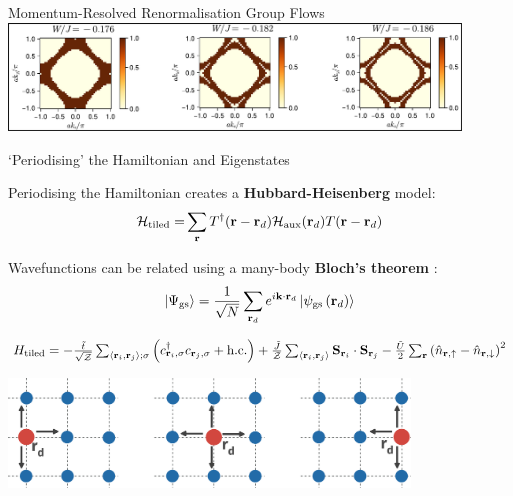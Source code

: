 \documentclass[11pt,aspectratio=169]{beamer}
\newcommand\focus[1]{%
	{\alert{\textbf{#1}}}
}
\begin{document}
\begin{frame}{Momentum-Resolved Renormalisation Group Flows}
\vspace*{\fill}
\includegraphics[width=0.9\textwidth]{scattProb.pdf}
	
\end{frame}

\begin{frame}{`Periodising' the Hamiltonian and Eigenstates}
	\begin{minipage}{0.45\textwidth}
		Periodising the Hamiltonian creates a \focus{Hubbard-Heisenberg} model:
	\begin{equation*}\begin{aligned}
		\mathcal{H}_\text{tiled} =& \sum_{{\bf r}}T^\dagger({\bf r} - {\bf r}_d)\mathcal{H}_\text{aux}({\bf r}_d)T({\bf r} - {\bf r}_d)\\
	\end{aligned}\end{equation*}
	\end{minipage}
	\hspace{\fill}
	\begin{minipage}{0.45\textwidth}
		Wavefunctions can be related using a many-body \focus{Bloch's theorem}:
	\[\ket{\Psi_\text{gs}} = \frac{1}{\sqrt N}\sum_{{\bf r}_d} e^{i {\bf k}\cdot{\bf r}_d} \ket{\psi_\text{gs}\left({\bf r}_d\right)}\]

	\end{minipage}

	\vspace*{\fill}
	\(H_\text{tiled} = -\frac{\tilde t}{\sqrt{\mathcal{Z}}}\sum_{\left<{\bf r}_i, {\bf r}_j\right>;\sigma}\left(c^\dagger_{{\bf r}_i,\sigma}c_{{\bf r}_j,\sigma} + \text{h.c.}\right) + \frac{\tilde J}{\mathcal{Z}}\sum_{\left< {\bf r}_i, {\bf r}_j\right>}{\bf S}_{{\bf r}_i}\cdot{\bf S}_{{\bf r}_j} - \frac{\tilde U}{2}\sum_{\bf r}\left(\hat n_{{\bf r} , \uparrow} - \hat n_{{\bf r} , \downarrow}\right)^2\)

	\vspace*{15pt}
	\includegraphics[width=0.8\textwidth]{periodisation.pdf}
	
\end{frame}
\end{document}
